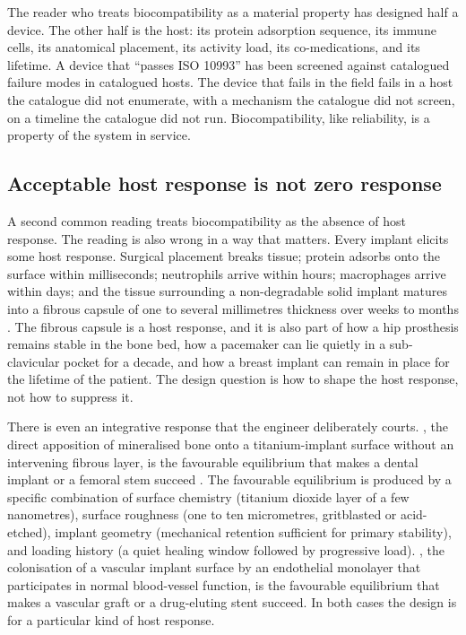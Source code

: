 \begin{archetype}
The reader who treats biocompatibility as a material property has
designed half a device. The other half is the host: its protein
adsorption sequence, its immune cells, its anatomical placement,
its activity load, its co-medications, and its lifetime. A device
that ``passes ISO 10993'' has been screened against catalogued
failure modes in catalogued hosts. The device that fails in the
field fails in a host the catalogue did not enumerate, with a
mechanism the catalogue did not screen, on a timeline the
catalogue did not run. Biocompatibility, like reliability, is a
property of the system in service.
\end{archetype}

\subsection{Acceptable host response is not zero response}

A second common reading treats biocompatibility as the absence of
host response. The reading is also wrong in a way that matters.
Every implant elicits some host response. Surgical placement breaks
tissue; protein adsorbs onto the surface within milliseconds;
neutrophils arrive within hours; macrophages arrive within days;
and the tissue surrounding a non-degradable solid implant
matures into a fibrous capsule of one to several millimetres
thickness over weeks to months
\cite{paper:v6c12-anderson-foreign-body-2008}. The fibrous capsule
is a host response, and it is also part of how a hip prosthesis
remains stable in the bone bed, how a pacemaker can lie quietly in
a sub-clavicular pocket for a decade, and how a breast implant can
remain in place for the lifetime of the patient. The design
question is how to shape the host response, not how to suppress it.

There is even an integrative response that the engineer
deliberately courts. , the direct apposition
of mineralised bone onto a titanium-implant surface without an
intervening fibrous layer, is the favourable equilibrium that
makes a dental implant or a femoral stem succeed
\cite{paper:v6c12-park-titanium-osseointegration-2009}. The
favourable equilibrium is produced by a specific combination of
surface chemistry (titanium dioxide layer of a few nanometres),
surface roughness (one to ten micrometres, gritblasted or
acid-etched), implant geometry (mechanical retention sufficient
for primary stability), and loading history (a quiet healing
window followed by progressive load).
, the colonisation of a vascular
implant surface by an endothelial monolayer that participates in
normal blood-vessel function, is the favourable equilibrium that
makes a vascular graft or a drug-eluting stent succeed. In both
cases the design is for a particular kind of host response.

